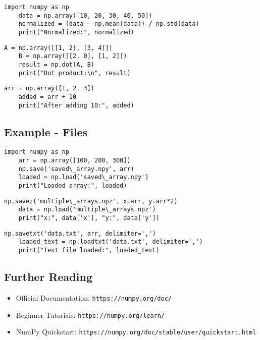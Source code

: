 \begin{lstlisting}[style=pythonstyle,caption={1. Normalize Data}]
	import numpy as np
	data = np.array([10, 20, 30, 40, 50])
	normalized = (data - np.mean(data)) / np.std(data)
	print("Normalized:", normalized)
\end{lstlisting}

\begin{lstlisting}[style=pythonstyle,caption={2. Matrix Multiplication}]
	A = np.array([[1, 2], [3, 4]])
	B = np.array([[2, 0], [1, 2]])
	result = np.dot(A, B)
	print("Dot product:\n", result)
\end{lstlisting}

\begin{lstlisting}[style=pythonstyle,caption={3. Broadcasting Addition}]
	arr = np.array([1, 2, 3])
	added = arr + 10
	print("After adding 10:", added)
\end{lstlisting}

\subsection{Example - Files}

\begin{lstlisting}[style=pythonstyle,caption={1. Save and Load Array}]
	import numpy as np
	arr = np.array([100, 200, 300])
	np.save('saved\_array.npy', arr)
	loaded = np.load('saved\_array.npy')
	print("Loaded array:", loaded)
\end{lstlisting}

\begin{lstlisting}[style=pythonstyle,caption={2. Save and Load Multiple Arrays}]
	np.savez('multiple\_arrays.npz', x=arr, y=arr*2)
	data = np.load('multiple\_arrays.npz')
	print("x:", data['x'], "y:", data['y'])
\end{lstlisting}

\begin{lstlisting}[style=pythonstyle,caption={3. Save as Text File}]
	np.savetxt('data.txt', arr, delimiter=',')
	loaded_text = np.loadtxt('data.txt', delimiter=',')
	print("Text file loaded:", loaded_text)
\end{lstlisting}

\subsection{Further Reading}
\begin{itemize}
	\item Official Documentation: \texttt{https://numpy.org/doc/}
	\item Beginner Tutorials: \texttt{https://numpy.org/learn/}
	\item NumPy Quickstart: \texttt{https://numpy.org/doc/stable/user/quickstart.html}
\end{itemize}



